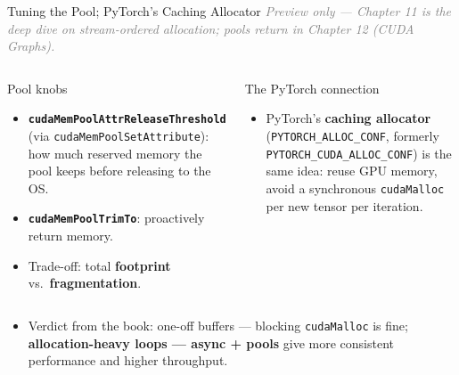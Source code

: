 \documentclass[aspectratio=169]{beamer}
\newcommand{\kw}[1]{\textbf{\textcolor{kwblue}{#1}}}
\newcommand{\bridge}[1]{{\footnotesize\itshape\textcolor{gray}{#1}}\par}
\begin{document}
\begin{frame}{Tuning the Pool; PyTorch's Caching Allocator}
  \bridge{Preview only --- Chapter 11 is the deep dive on stream-ordered allocation; pools return in Chapter 12 (CUDA Graphs).}
  \begin{columns}[t]
    \begin{block}{Pool knobs}
      \begin{itemize}\small
        \item \kw{\texttt{cudaMemPoolAttrReleaseThreshold}} (via
              \texttt{cudaMemPoolSetAttribute}): how much reserved memory the pool keeps
              before releasing to the OS.
        \item \kw{\texttt{cudaMemPoolTrimTo}}: proactively return memory.
        \item Trade-off: total \kw{footprint} vs.\ \kw{fragmentation}.
      \end{itemize}
    \end{block}
    \begin{block}{The PyTorch connection}
      \begin{itemize}\small
        \item PyTorch's \kw{caching allocator} (\texttt{PYTORCH\_ALLOC\_CONF}, formerly
              \texttt{PYTORCH\_CUDA\_ALLOC\_CONF}) is the same idea: reuse GPU memory,
              avoid a synchronous \texttt{cudaMalloc} per new tensor per iteration.
      \end{itemize}
    \end{block}
  \end{columns}
  \medskip
  \begin{itemize}
    \item Verdict from the book: one-off buffers --- blocking \texttt{cudaMalloc} is fine;
          \kw{allocation-heavy loops --- async + pools} give more consistent performance
          and higher throughput.
  \end{itemize}
\end{frame}
\end{document}

